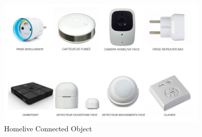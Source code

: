 \begin{figure}[htbp]
	\centering
		\includegraphics[width=10cm]{Figures/home-live_capteurs.jpg}
	\caption[Homelive Connected Object]{Homelive Connected Object}%
	\label{fig:2}
\end{figure}
